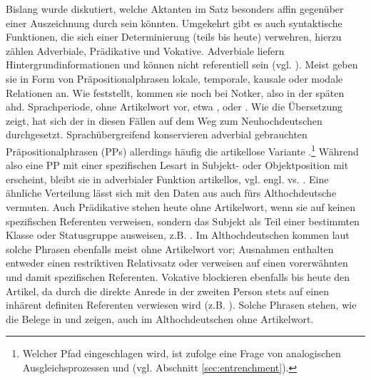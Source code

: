 Bislang wurde diskutiert, welche Aktanten im Satz besonders affin gegenüber einer Auszeichnung durch  sein könnten. Umgekehrt gibt es auch syntaktische Funktionen, die sich einer Determinierung (teils bis heute) verwehren, hierzu zählen  Adverbiale, Prädikative  und  Vokative. Adverbiale  liefern Hintergrundinformationen und können nicht referentiell sein (vgl. ). Meist geben sie in Form von Präpositionalphrasen lokale, temporale, kausale oder modale Relationen an. Wie \textcite[84]{Oubouzar1992} feststellt, kommen sie noch bei Notker, also in der späten ahd. Sprachperiode, ohne Artikelwort vor, etwa  ,   oder   \parencite[vgl. auch][76]{Szczepaniak2011a}. Wie die Übersetzung zeigt, hat sich der  in diesen Fällen auf dem Weg zum Neuhochdeutschen durchgesetzt. Sprachübergreifend konservieren adverbial  gebrauchten Präpositionalphrasen  (PPs) allerdings häufig die artikellose Variante \parencite{Himmelmann1998}.\footnote{Welcher Pfad eingeschlagen wird, ist \textcite[342 und 344--345]{Himmelmann1998} zufolge eine Frage von analogischen  Ausgleichsprozessen und  (vgl. Abschnitt \ref{sec:entrenchment}).} Während also eine PP  mit einer spezifischen Lesart in Subjekt-  oder Objektposition  mit  erscheint, bleibt sie in adverbialer  Funktion artikellos, vgl. engl.  vs.  \parencite[332]{Himmelmann1998}. Eine ähnliche Verteilung lässt sich mit den Daten aus \textcite[84--85]{Oubouzar1992} auch fürs Althochdeutsche vermuten. Auch Prädikative  stehen heute ohne Artikelwort, wenn sie auf keinen spezifischen Referenten verweisen, sondern das Subjekt als Teil einer bestimmten Klasse oder Statusgruppe ausweisen, z.B.  \parencite[vgl.][218]{DAvis2013}. Im Althochdeutschen kommen laut \textcite[6--8]{Graf1905} solche Phrasen  ebenfalls meist ohne Artikelwort vor; Ausnahmen enthalten entweder einen restriktiven Relativsatz oder verweisen auf einen  vorerwähnten und damit spezifischen Referenten. Vokative  blockieren ebenfalls bis heute den Artikel, da durch die direkte Anrede in der zweiten Person stets auf einen inhärent definiten  Referenten verwiesen wird (z.B. ). Solche Phrasen   stehen, wie die Belege in \textcite[13]{Graf1905} und \textcite[40]{Bell1907} zeigen, auch im Althochdeutschen ohne Artikelwort. 

